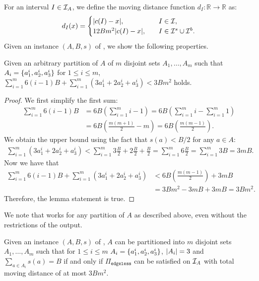 For an interval $I\in \mathcal{I}_A$, we define the moving distance function $d_I:\mathbb{R}\rightarrow\mathbb{R}$ as:
\begin{align*}
    d_I(x) = \begin{cases}
        |c(I)-x|,&\quad I \in \mathcal{I},\\
        12Bm^2|c(I)-x|,& \quad I \in \mathcal{I}^s \cup \mathcal{I}^b.
    \end{cases}
\end{align*}
Given an instance $(A,B,s)$ of {\threepartition}, we show the following properties.
\begin{mlemmarep}\label{lem:cumulative_sum_bound}
    Given an arbitrary partition of $A$ of $m$ disjoint sets $A_1,\ldots,A_m$ such that $A_i =\{a^i_1,a^i_2,a^i_3\}$ for $1\le i \le m$, $\sum_{i=1}^m 6(i-1)B + \sum^m_{i=1} (3a^i_1+2a^i_2+a^i_3) < 3Bm^2$ holds.
\end{mlemmarep}
\begin{proof}
    We first simplify the first sum:
    \begin{align*}
        \sum_{i=1}^m 6(i-1)B & = 6B\left(\sum_{i=1}^m i-1\right) = 6B\left(\sum_{i=1}^m i - \sum_{i=1}^m 1\right)\\
        & = 6B\left(\frac{m(m+1)}{2} - m\right) = 6B\left(\frac{m(m-1)}{2}\right).
    \end{align*}
    We obtain the upper bound using the fact that $s(a)< B/2$ for any $a \in A$:
    \begin{align*} \sum^m_{i=1} (3a^i_1+2a^i_2+a^i_3) <\sum_{i=1}^m 3\frac{B}{2}+2\frac{B}{2}+\frac{B}{2} = \sum_{i=1}^m 6\frac{B}{2} = \sum_{i=1}^m 3B = 3mB.
    \end{align*}
    Now we have that
    \begin{align*}
        \sum_{i=1}^m 6(i-1)B + \sum^m_{i=1} (3a^i_1+2a^i_2+a^i_3) & < 6B\left(\frac{m(m-1)}{2}\right) + 3mB\\
        & = 3Bm^2 -3mB +3mB = 3Bm^2.
    \end{align*}
    Therefore, the lemma statement is true.
\end{proof}
We note that  works for any partition of $A$ as described above, even without the restrictions of the {\threepartition} output.
\begin{mlemmarep}\label{lem:3p_iff_gged_edgeless}
    Given an instance $(A,B,s)$ of {\threepartition}, $A$ can be partitioned into $m$ disjoint sets $A_1,\ldots,A_m$ such that for $1\le i \le m$ $A_i = \{a^i_1,a^i_2,a^i_3\}$, $|A_i| = 3$ and $\sum_{a\in A_i} s(a) = B$ if and only if $\Pi_{\texttt{edgeless}}$ can be satisfied on $\mathcal{I}_A$ with total moving distance of at most $3Bm^2$.
\end{mlemmarep}
